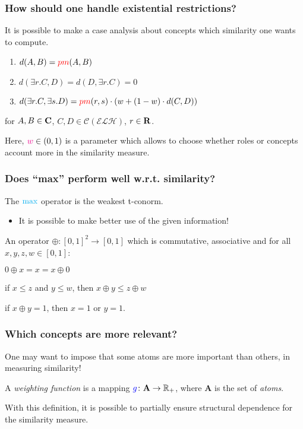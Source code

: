 \documentclass[smaller]{beamer}
\begin{document}
\begin{frame}
  \frametitle{How should one handle existential restrictions?}
  It is possible to make a case analysis about
  concepts which similarity one wants to compute.
  \begin{enumerate}[<+->]
    \item \(d(A,B) = \textcolor{red}{pm}(A,B)\)
    \item \(d(\exists{}r.C,D) = d(D,\exists{}r.C) = 0\)
    \item \(d(\exists{}r.C,\exists{}s.D) =
    \textcolor{red}{pm}(r,s) \cdot \left(w + (1-w) \cdot d(C,D)\right)\)
  \end{enumerate}
  for \(A,B \in \mathbf{C}\),
  \(C,D \in \mathcal{C}(\mathcal{ELH})\),
  \(r \in \mathbf{R}\).

  Here, \(\textcolor{magenta}{w} \in (0,1)\) is a parameter which allows
  to choose whether roles or concepts account more
  in the similarity measure.
\end{frame}

\begin{frame}
  \frametitle{Does ``max'' perform well w.r.t. similarity?}
  The \(\textcolor{cyan}{\max}\) operator is the weakest \alert{t-conorm}.
  \begin{itemize}
    \item It is possible to make better use of
          the given information!
  \end{itemize}
  \pause
  \begin{definition}
    An operator \(\oplus \colon {[0,1]}^2 \to [0,1]\) which is
    commutative, associative and for all
    \(x, y, z, w \in [0,1]\):
    \begin{description}[<+->]
      \item[Unit element] \(0 \oplus x = x = x \oplus 0\)
      \item[Monotonicity] if \(x \le z\) and \(y \le w\), then \(x \oplus y \le z \oplus w\)
      \item[Boundedness] if \(x \oplus y = 1\), then \(x = 1\) or \(y = 1\).
    \end{description}
  \end{definition}
\end{frame}

\begin{frame}
  \frametitle{Which concepts are more relevant?}
  One may want to impose that some atoms are
  more important than others, in measuring similarity!
  \begin{definition}
    A \emph{weighting function} is a mapping 
    \(\textcolor{blue}{g} \colon \mathbf{A} \to \mathbb{R}_+\),
     where \(\mathbf{A}\) is the set of \emph{atoms}.
  \end{definition}
  With this definition, it is possible to partially
  ensure structural dependence for the similarity
  measure.
\end{frame}
\end{document}
